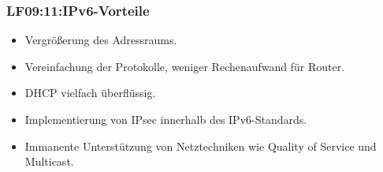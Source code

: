 \begin{frame}
  \frametitle{LF09:11:IPv6-Vorteile}

  \begin{footnotesize}

  \begin{itemize}
    \item Vergrößerung des Adressraums. 
    \item Vereinfachung der Protokolle, weniger Rechenaufwand für Router. 
    \item DHCP vielfach überflüssig.
    \item Implementierung von IPsec innerhalb des IPv6-Standards.
    \item Immanente Unterstützung von Netztechniken wie Quality of Service und Multicast.
  \end{itemize}

\end{footnotesize}

\end{frame}


